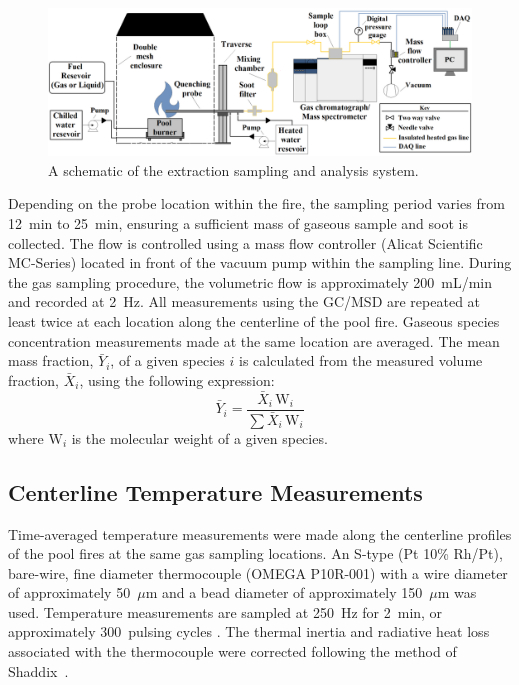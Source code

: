 \documentclass[preprint,review,12pt]{elsarticle}
\begin{document}
\begin{figure}
	\centering
\includegraphics[width=14.4 cm,keepaspectratio]{Experimental_Setup.png}
	\caption[A schematic of the gas sampling procedure]{A schematic of the extraction sampling and analysis system.}
	\label{fig:Experimental_Setup}
\end{figure}
Depending on the probe location within the fire, the sampling period varies from \SI{12}{min} to \SI{25}{min}, ensuring a sufficient mass of gaseous sample and soot is collected. The flow is controlled using a mass flow controller (Alicat Scientific MC-Series) located in front of the vacuum pump within the sampling line. During the gas sampling procedure, the volumetric flow is approximately 200~mL/min and recorded at \SI{2}{\hertz}. All measurements using the GC/MSD are repeated at least twice at each location along the centerline of the pool fire. Gaseous species concentration measurements made at the same location are averaged. The mean mass fraction, $\bar{Y}_{i}$, of a given species $i$ is calculated from the measured volume fraction, $\bar{X}_{i}$, using the following expression:
\begin{equation}\label{eq:mass_fraction}
	\bar{Y}_{i}=\frac{\bar{X}_{i} \, {\textrm{W}_{i}}}{\sum{\bar{X}_{i} \, {\textrm{W}_{i}}}}
\end{equation}
where ${{\textrm{W}_{i}}}$ is the molecular weight of a given species.

\subsection{Centerline Temperature Measurements}
\label{ssec:Temperature_Measurements}
Time-averaged temperature measurements were made along the centerline profiles of the pool fires at the same gas sampling locations. An S-type (Pt 10\% Rh/Pt), bare-wire, fine diameter thermocouple (OMEGA P10R-001) with a wire diameter of approximately 50~$\mu$m and a bead diameter of approximately 150~$\mu$m was used. Temperature measurements are sampled at \SI{250}{Hz} for \SI{2}{min}, or approximately 300~pulsing cycles \cite{Wang2019}. The thermal inertia and radiative heat loss associated with the thermocouple were corrected following the method of Shaddix~\cite{Shaddix1999}.
\end{document}
